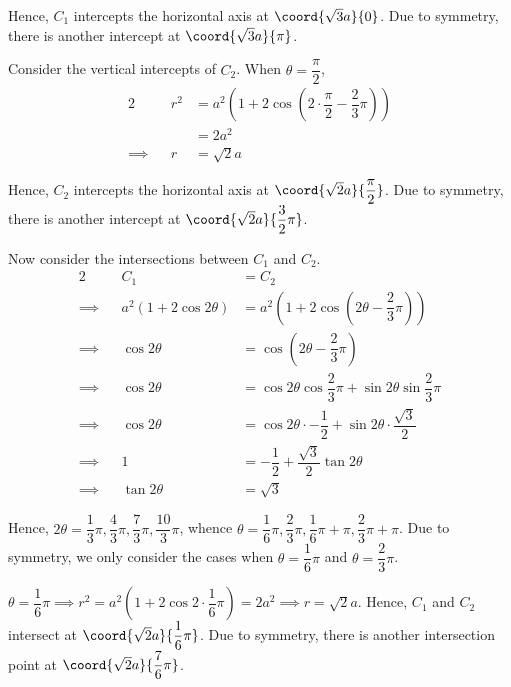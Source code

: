 \documentclass{jhwhw}
\begin{document}
            Hence, $C_1$ intercepts the horizontal axis at $\coord{\sqrt3a}{0}$. Due to symmetry, there is another intercept at $\coord{\sqrt3a}{\pi}$.

            Consider the vertical intercepts of $C_2$. When $\theta = \dfrac\pi2$,
            \begin{alignat*}{2}
                &&r^2 &= a^2 \left(1 + 2\cos \left(2\cdot\dfrac\pi2 - \dfrac23 \pi \right)\right)\\
                && &= 2a^2\\
                \implies&&r &= \sqrt2a
            \end{alignat*}

            Hence, $C_2$ intercepts the horizontal axis at $\coord{\sqrt2a}{\dfrac\pi2}$. Due to symmetry, there is another intercept at $\coord{\sqrt2a}{\dfrac32 \pi}$.

            Now consider the intersections between $C_1$ and $C_2$.
            \begin{alignat*}{2}
                &&C_1 &= C_2\\
                \implies&&a^2\left(1 + 2\cos2\theta\right) &= a^2 \left(1 + 2\cos \left(2\theta - \dfrac23 \pi \right)\right)\\
                \implies&&\cos2\theta &= \cos \left(2\theta - \dfrac23 \pi \right)\\
                \implies&&\cos2\theta &= \cos2\theta\cos\dfrac23\pi + \sin2\theta\sin\dfrac23\pi\\
                \implies&&\cos2\theta &= \cos2\theta\cdot-\dfrac12 + \sin2\theta\cdot\dfrac{\sqrt3}2\\
                \implies&&1 &= -\dfrac12 + \dfrac{\sqrt3}2\tan2\theta\\
                \implies&&\tan2\theta &= \sqrt3
            \end{alignat*}

            Hence, $2\theta = \dfrac13\pi, \dfrac43\pi, \dfrac73\pi,\dfrac{10}3\pi$, whence $\theta = \dfrac16\pi, \dfrac23\pi, \dfrac16\pi + \pi, \dfrac23\pi + \pi$. Due to symmetry, we only consider the cases when $\theta = \dfrac16\pi$ and $\theta = \dfrac23\pi$.

             $\theta = \dfrac16\pi \implies r^2 = a^2 \left(1 + 2\cos 2\cdot\dfrac16\pi\right) = 2a^2 \implies r = \sqrt2a$. Hence, $C_1$ and $C_2$ intersect at $\coord{\sqrt2a}{\dfrac16 \pi}$. Due to symmetry, there is another intersection point at $\coord{\sqrt2a}{\dfrac76 \pi}$.
\end{document}
